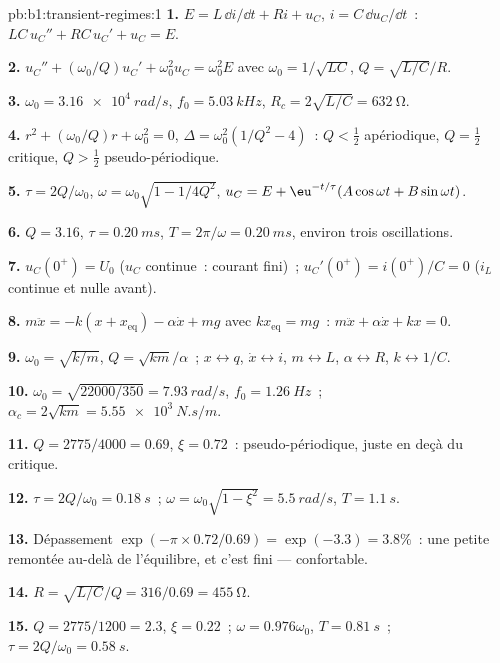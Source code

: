 \begin{solution}{pb:b1:transient-regimes:1}
\textbf{1.} $E = L\,\dd i/\dd t + Ri + u_C$, $i = C\,\dd u_C/\dd t$~:
$LC\,u_C'' + RC\,u_C' + u_C = E$.

\textbf{2.} $u_C'' + (\omega_0/Q)u_C' + \omega_0^2u_C = \omega_0^2E$ avec
$\omega_0 = 1/\sqrt{LC}$, $Q = \sqrt{L/C}/R$.

\textbf{3.} $\omega_0 = \qty{3.16e4}{rad/s}$, $f_0 = \qty{5.03}{kHz}$,
$R_c = 2\sqrt{L/C} = \qty{632}{\ohm}$.

\textbf{4.} $r^2 + (\omega_0/Q)r + \omega_0^2 = 0$, $\Delta = \omega_0^2(1/Q^2
- 4)$~: $Q < \tfrac12$ apériodique, $Q = \tfrac12$ critique, $Q > \tfrac12$
pseudo-périodique.

\textbf{5.} $\tau = 2Q/\omega_0$, $\omega = \omega_0\sqrt{1 - 1/4Q^2}$,
$u_C = E + \eu^{-t/\tau}(A\cos\omega t + B\sin\omega t)$.

\textbf{6.} $Q = 3.16$, $\tau = \qty{0.20}{ms}$, $T = 2\pi/\omega =
\qty{0.20}{ms}$, environ trois oscillations.

\textbf{7.} $u_C(0^+) = U_0$ ($u_C$ continue~: courant fini)~;
$u_C'(0^+) = i(0^+)/C = 0$ ($i_L$ continue et nulle avant).

\textbf{8.} $m\ddot x = -k(x + x_{\text{eq}}) - \alpha\dot x + mg$ avec
$kx_{\text{eq}} = mg$~: $m\ddot x + \alpha\dot x + kx = 0$.

\textbf{9.} $\omega_0 = \sqrt{k/m}$, $Q = \sqrt{km}/\alpha$~; $x \leftrightarrow
q$, $\dot x \leftrightarrow i$, $m \leftrightarrow L$, $\alpha \leftrightarrow
R$, $k \leftrightarrow 1/C$.

\textbf{10.} $\omega_0 = \sqrt{22000/350} = \qty{7.93}{rad/s}$, $f_0 =
\qty{1.26}{Hz}$~; $\alpha_c = 2\sqrt{km} = \qty{5.55e3}{N.s/m}$.

\textbf{11.} $Q = 2775/4000 = 0.69$, $\xi = 0.72$~: pseudo-périodique,
juste en deçà du critique.

\textbf{12.} $\tau = 2Q/\omega_0 = \qty{0.18}{s}$~; $\omega = \omega_0\sqrt{1
- \xi^2} = \qty{5.5}{rad/s}$, $T = \qty{1.1}{s}$.

\textbf{13.} Dépassement $\exp(-\pi \times 0.72/0.69) = \exp(-3.3) = 3.8\%$~:
une petite remontée au-delà de l'équilibre, et c'est fini --- confortable.

\textbf{14.} $R = \sqrt{L/C}/Q = 316/0.69 = \qty{455}{\ohm}$.

\textbf{15.} $Q = 2775/1200 = 2.3$, $\xi = 0.22$~; $\omega = 0.976\omega_0$,
$T = \qty{0.81}{s}$~; $\tau = 2Q/\omega_0 = \qty{0.58}{s}$.


\end{solution}
